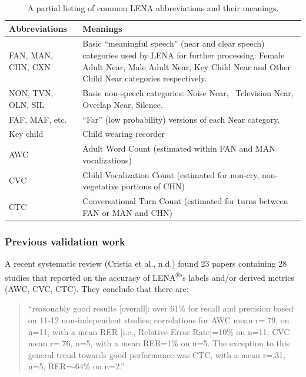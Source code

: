 \documentclass[english,table,man,floatsintext]{apa6}
\begin{document}
\begin{table}[t]

\caption{\label{tab:tab-abb}A partial listing of common LENA abbreviations and their meanings.}
\centering
\begin{tabular}{>{\raggedright\arraybackslash}p{12em}>{\raggedright\arraybackslash}p{28em}}
\toprule
Abbreviations & Meanings\\
\midrule
FAN, MAN, CHN, CXN & Basic “meaningful speech” (near and clear speech) categories used by LENA for further processing: Female Adult Near, Male Adult Near, Key Child Near and Other Child Near categories respectively.\\
NON, TVN, OLN, SIL & Basic non-speech categories: Noise Near,  Television Near, Overlap Near, Silence.\\
FAF, MAF, etc. & “Far” (low probability) versions of each Near category.\\
Key child & Child wearing recorder\\
AWC & Adult Word Count (estimated within FAN and MAN vocalizations)\\
\addlinespace
CVC & Child Vocalization Count (estimated for non-cry, non-vegetative portions of CHN)\\
CTC & Conversational Turn Count (estimated for turns between FAN or MAN and CHN)\\
\bottomrule
\end{tabular}
\end{table}

\hypertarget{previous-validation-work}{%
\subsubsection{Previous validation work}\label{previous-validation-work}}

A recent systematic review (Cristia et al., n.d.) found 23 papers containing 28 studies that reported on the accuracy of LENA\textsuperscript{®}'s labels and/or derived metrics (AWC, CVC, CTC). They conclude that there are:

\begin{quote}
\enquote{reasonably good results {[}overall{]}: over 61\% for recall and precision based on 11-12 non-independent studies; correlations for AWC mean r=.79, on n=11, with a mean RER {[}i.e., Relative Error Rate{]}=10\% on n=11; CVC mean r=.76, n=5, with a mean RER=1\% on n=5. The exception to this general trend towards good performance was CTC, with a mean r=.31, n=5, RER=-64\% on n=2.}
\end{quote}
\end{document}
